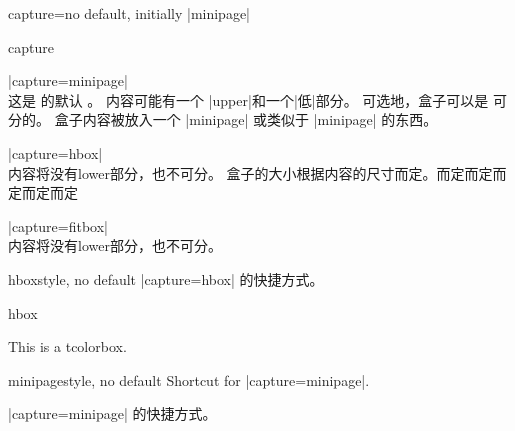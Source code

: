 \begin{docTcbKey}{capture}{=}{no default, initially |minipage|}
\begin{exdispExample}{capture}

\begin{tcolorbox}[capture=minipage]
|capture=minipage|\\
这是  的默认  。%
内容可能有一个 |upper|和一个|低|部分。%
\tcblower
可选地，盒子可以是  可分的。
盒子内容被放入一个 |minipage| 或类似于 |minipage| 的东西。
\end{tcolorbox}

\begin{tcolorbox}[capture=hbox]
|capture=hbox|\\
内容将没有lower部分，也不可分。%
盒子的大小根据内容的尺寸而定。而定而定而定而定而定%
\end{tcolorbox}

\begin{tcolorbox}[capture=fitbox,height=9mm]%
|capture=fitbox|\\
内容将没有lower部分，也不可分。
\end{tcolorbox}
\end{exdispExample}
\end{docTcbKey}




\begin{docTcbKey}{hbox}{}{style, no default}
|capture=hbox| 的快捷方式。
\begin{exdispExample}{hbox}

\begin{tcolorbox}[hbox]
This is a tcolorbox.
\end{tcolorbox}
\end{exdispExample}
\end{docTcbKey}


\begin{docTcbKey}{minipage}{}{style, no default}
  Shortcut for |capture=minipage|.

  |capture=minipage| 的快捷方式。
\end{docTcbKey}




